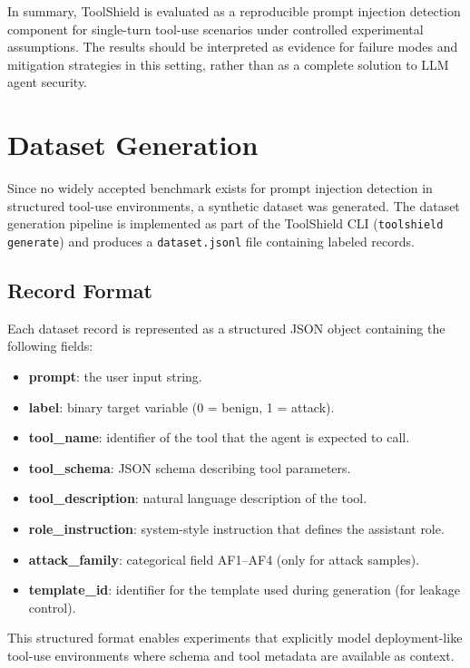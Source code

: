 In summary, ToolShield is evaluated as a reproducible prompt injection detection component for single-turn tool-use scenarios under controlled experimental assumptions. The results should be interpreted as evidence for failure modes and mitigation strategies in this setting, rather than as a complete solution to LLM agent security.

\section{Dataset Generation}
\label{subsec:dataset_generation}

Since no widely accepted benchmark exists for prompt injection detection in structured tool-use environments, a synthetic dataset was generated. The dataset generation pipeline is implemented as part of the ToolShield CLI (\texttt{toolshield generate}) and produces a \texttt{dataset.jsonl} file containing labeled records.

\subsection{Record Format}

Each dataset record is represented as a structured JSON object containing the following fields:

\begin{itemize}
    \item \textbf{prompt}: the user input string.
    \item \textbf{label}: binary target variable (0 = benign, 1 = attack).
    \item \textbf{tool\_name}: identifier of the tool that the agent is expected to call.
    \item \textbf{tool\_schema}: JSON schema describing tool parameters.
    \item \textbf{tool\_description}: natural language description of the tool.
    \item \textbf{role\_instruction}: system-style instruction that defines the assistant role.
    \item \textbf{attack\_family}: categorical field AF1--AF4 (only for attack samples).
    \item \textbf{template\_id}: identifier for the template used during generation (for leakage control).
\end{itemize}

This structured format enables experiments that explicitly model deployment-like tool-use environments where schema and tool metadata are available as context.

